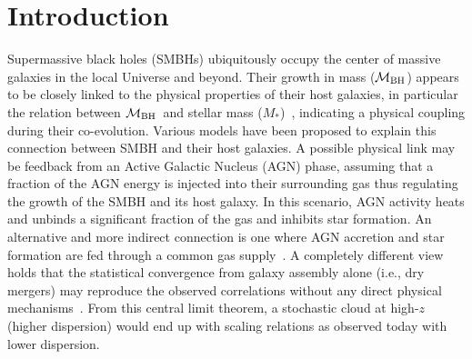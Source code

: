 \documentclass[twocolumn,trackchanges]{aastex63}
\newcommand{\mbh}{$\mathcal M_{\rm BH}$}
\newcommand{\mstar}{{$M_*$}}
\begin{document}

\section{Introduction} \label{sec:intro}
Supermassive black holes (SMBHs) ubiquitously occupy the center of massive galaxies in the local Universe and beyond. Their growth in mass (\mbh) appears to be closely linked to the physical properties of their host galaxies, in particular the relation between \mbh ~and stellar mass (\mstar)~\citep{Mag++98, F+M00, M+H03, H+R04, Gul++09}, indicating a physical coupling during their co-evolution.
Various models have been proposed to explain this connection between SMBH and their host galaxies. A possible physical link may be feedback from an Active Galactic Nucleus (AGN) phase, assuming that a fraction of the AGN energy is injected into their surrounding gas thus regulating the growth of the SMBH and its host galaxy. In this scenario, AGN activity heats and unbinds a significant fraction of the gas and inhibits star formation. An alternative and more indirect connection is one where AGN accretion and star formation are fed through a common gas supply~\citep{Cen2015, Menci2016}. A completely different view holds that the statistical convergence from galaxy assembly alone (i.e., dry mergers) may reproduce the observed correlations without any direct physical mechanisms~\citep{Peng2007, Jahnke2011, Hirschmann2010}. From this central limit theorem, a stochastic cloud at high-$z$ (higher dispersion) would end up with scaling relations as observed today with lower dispersion.
\end{document}
